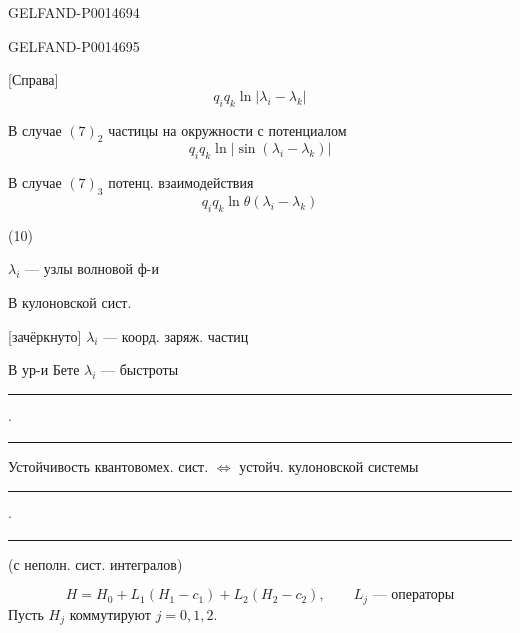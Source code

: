 \begin{GelfandAdjacentEvidence}{GELFAND-P001469}{4}

\end{GelfandAdjacentEvidence}
\begin{GelfandAdjacentEvidence}{GELFAND-P001469}{5}


[Справа] 
\[
q_iq_k\ln|\lambda_i-\lambda_k|
\]

В случае \((7)_2\)
частицы на окружности с потенциалом
\[
q_iq_k\ln|\sin(\lambda_i-\lambda_k)|
\]

В случае \((7)_3\) потенц. взаимодействия
\[
q_iq_k\ln\theta(\lambda_i-\lambda_k)
\]

(10) 

\(\lambda_i\) --- узлы волновой ф-и

В кулоновской сист.

[зачёркнуто] \(\lambda_i\) --- коорд. заряж. частиц
\end{GelfandAdjacentEvidence}


В ур-и Бете \(\lambda_i\) --- быстроты

\begin{center}
\rule{2cm}{.4pt}\quad\(\cdot\)\quad\rule{2cm}{.4pt}
\end{center}

Устойчивость квантовомех. сист. \(\Leftrightarrow\) устойч. кулоновской системы

\begin{center}
\rule{2cm}{.4pt}\quad\(\cdot\)\quad\rule{2cm}{.4pt}
\end{center}

 (с неполн. сист. интегралов)

\begin{equation*}
H=H_0+L_1(H_1-c_1)+L_2(H_2-c_2),\qquad L_j\text{ --- операторы}
\tag{11}
\end{equation*}
Пусть \(H_j\) коммутируют \(j=0,1,2\).


